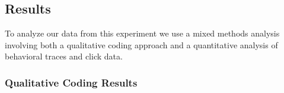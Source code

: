 \documentclass[12pt,letterpaper]{article}
\begin{document}




\subsection{Results}

To analyze our data from this experiment we use a mixed methods analysis involving both a qualitative coding approach and a quantitative analysis of behavioral traces and click data. 

\subsubsection{Qualitative Coding Results}
\end{document}
